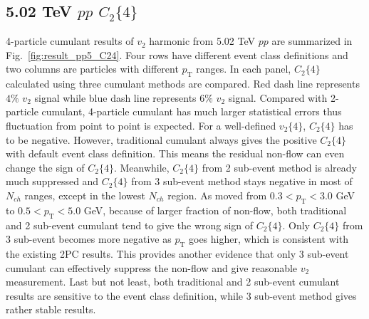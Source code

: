 \subsection{5.02 TeV $pp$ $C_{2}\{4\}$}
4-particle cumulant results of $v_{2}$ harmonic from 5.02 TeV $pp$ are summarized in Fig.~\ref{fig:result_pp5_C24}. Four rows have different event class definitions and two columns are particles with different $p_{\text{T}}$ ranges. In each panel, $C_{2}\{4\}$ calculated using three cumulant methods are compared. Red dash line represents $4\%$ $v_{2}$ signal while blue dash line represents $6\%$ $v_{2}$ signal. Compared with 2-particle cumulant, 4-particle cumulant has much larger statistical errors thus fluctuation from point to point is expected. For a well-defined $v_{2}\{4\}$, $C_{2}\{4\}$ has to be negative. However, traditional cumulant always gives the positive $C_{2}\{4\}$ with default event class definition. This means the residual non-flow can even change the sign of $C_{2}\{4\}$. Meanwhile, $C_{2}\{4\}$ from 2 sub-event method is already much suppressed and $C_{2}\{4\}$ from 3 sub-event method stays negative in most of $N_{ch}$ ranges, except in the lowest $N_{ch}$ region. As moved from $0.3<p_{\text{T}}<3.0$ GeV to $0.5<p_{\text{T}}<5.0$ GeV, because of larger fraction of non-flow, both traditional and 2 sub-event cumulant tend to give the wrong sign of $C_{2}\{4\}$. Only $C_{2}\{4\}$ from 3 sub-event becomes more negative as $p_{\text{T}}$ goes higher, which is consistent with the existing 2PC results. This provides another evidence that only 3 sub-event cumulant can effectively suppress the non-flow and give reasonable $v_{2}$ measurement. Last but not least, both traditional and 2 sub-event cumulant results are sensitive to the event class definition, while 3 sub-event method gives rather stable results.

